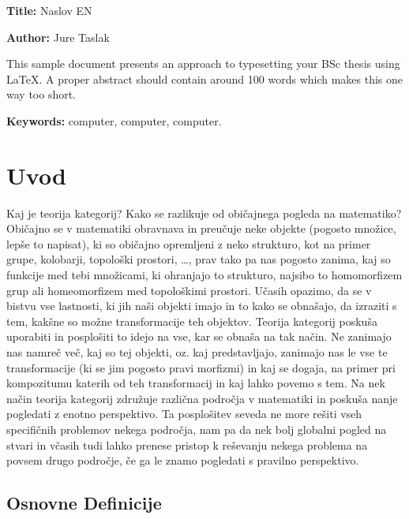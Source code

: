 \documentclass[12pt,a4paper]{book}
\newcommand{\ttitleEn}{Naslov EN}
\newcommand{\tauthor}{Jure Taslak}
\newcommand{\tkeywordsEn}{computer, computer, computer}
\newcommand{\clearemptydoublepage}{\newpage{\pagestyle{empty}\cleardoublepage}}
\theoremstyle{definition}
\theoremstyle{plain}
\theoremstyle{definition}
\theoremstyle{remark}
\begin{document}
\noindent\textbf{Title:} \ttitleEn
\bigskip

\noindent\textbf{Author:} \tauthor
\bigskip

\noindent This sample document presents an approach to typesetting your BSc thesis using \LaTeX. 
A proper abstract should contain around 100 words which makes this one way too short.
\bigskip

\noindent\textbf{Keywords:} \tkeywordsEn.
\clearemptydoublepage

\mainmatter
\setcounter{page}{1}
\pagestyle{fancy}

\chapter{Uvod}
Kaj je teorija kategorij? Kako se razlikuje od običajnega pogleda na matematiko? Običajno se v matematiki obravnava in preučuje neke objekte (pogosto množice, lepše to napisat), ki so običajno opremljeni z neko strukturo, kot na primer grupe, kolobarji, topološki prostori, \ldots, prav tako pa nas pogosto zanima, kaj so funkcije med tebi množicami, ki ohranjajo to strukturo, najsibo to homomorfizem grup ali homeomorfizem med topološkimi prostori. Učasih opazimo, da se v bistvu vse lastnosti, ki jih naši objekti imajo in to kako se obnašajo, da izraziti s tem, kakšne so možne transformacije teh objektov. Teorija kategorij poskuša uporabiti in posplošiti to idejo na vse, kar se obnaša na tak način. Ne zanimajo nas namreč več, kaj so tej objekti, oz. kaj predstavljajo, zanimajo nas le vse te transformacije (ki se jim pogosto pravi morfizmi) in kaj se dogaja, na primer pri kompozitumu katerih od teh transformacij in kaj lahko povemo s tem. Na nek način teorija kategorij združuje različna področja v matematiki in poskuša nanje pogledati z enotno perspektivo. Ta posplošitev seveda ne more rešiti vseh specifičnih problemov nekega področja, nam pa da nek bolj globalni pogled na stvari in včasih tudi lahko prenese pristop k reševanju nekega problema na povsem drugo področje, če ga le znamo pogledati s pravilno perspektivo.

\section{Osnovne Definicije}
\end{document}
